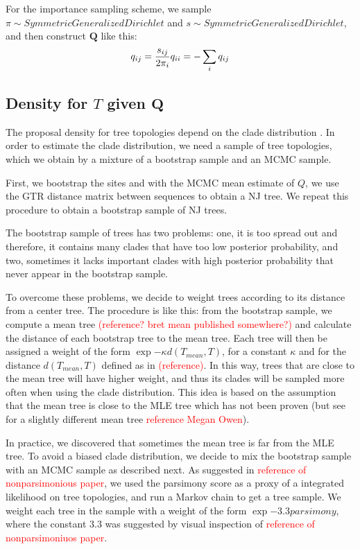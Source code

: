 \documentclass[useAMS,usenatbib]{biom}
\newcommand{\falta}[1]{\textcolor{red}{#1}}
\begin{document}
For the importance sampling scheme, we sample $\pi\sim
SymmetricGeneralizedDirichlet$ and $s\sim
SymmetricGeneralizedDirichlet$, and then construct $\mathbf{Q}$ like
this:
\begin{equation}
q_{ij} = \frac{s_{ij}}{2\pi_i} \\
q_{ii} = -\sum_i q_{ij}
\end{equation}



\subsection{Density for $T$ given $\mathbf{Q}$}
The proposal density for tree topologies depend on the clade
distribution \citep{Larget2013}. In order to estimate the clade
distribution, we need a sample of tree topologies, which we obtain by
a mixture of a bootstrap sample and an MCMC sample.

First, we bootstrap the sites and with the MCMC mean estimate of $Q$,
we use the GTR distance matrix between sequences to obtain a NJ tree.
We repeat this procedure to obtain a bootstrap sample of NJ trees.

The bootstrap sample of trees has two problems: one, it is too spread
out and therefore, it contains many clades that have too low posterior
probability, and two, sometimes it lacks important clades with high
posterior probability that never appear in the bootstrap
sample.

To overcome these problems, we decide to weight trees according to its
distance from a center tree. The procedure is like this: from the
bootstrap sample, we compute a mean tree \falta{(reference? bret mean
  published somewhere?)} and calculate the distance of each bootstrap
tree to the mean tree. Each tree will then be assigned a weight of the
form $\exp{-\kappa d(T_{mean},T)}$, for a constant $\kappa$ and for
the distance $d(T_{mean},T)$ defined as in \falta{(reference)}. In
this way, trees that are close to the mean tree will have higher
weight, and thus its clades will be sampled more often when using the
clade distribution. This idea is based on the assumption that the mean
tree is close to the MLE tree which has not been proven (but see for a
slightly different mean tree \falta{reference Megan Owen}).

In practice, we discovered that sometimes the mean tree is far from
the MLE tree. To avoid a biased clade distribution, we decide to mix
the bootstrap sample with an MCMC sample as described next. As
suggested in \falta{reference of nonparsimonious paper}, we used the
parsimony score as a proxy of a integrated likelihood on tree
topologies, and run a Markov chain to get a tree sample. We weight
each tree in the sample with a weight of the form $\exp{-3.3
  parsimony}$, where the constant $3.3$ was suggested by visual
inspection of \falta{reference of nonparsimoniuos paper}.
\end{document}
